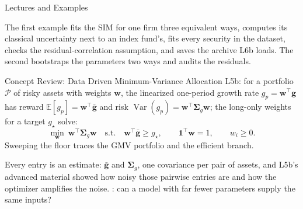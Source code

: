 \documentclass[aspectratio=169,11pt]{beamer}
\newcommand{\E}{\mathbb{E}}
\newcommand{\Var}{\operatorname{Var}}
\newcommand{\bg}{\mathbf{g}}
\newcommand{\bw}{\mathbf{w}}
\newcommand{\Sig}{\boldsymbol{\Sigma}_{g}}
\begin{document}
\begin{frame}{Lectures and Examples}
  \vspace{0.3em}
  {\normalsize\textbf{}\par
  }

  \vspace{0.7em}
  {\normalsize\textbf{}\par
  }

  \vspace{0.7em}
  {\normalsize\textbf{}\par
  }

  \vspace{0.6em}
  The first example fits the SIM for one firm three equivalent ways, computes
  its classical uncertainty next to an index fund's, fits every security in the
  dataset, checks the residual-correlation assumption, and saves the archive L6b
  loads. The second bootstraps the parameters two ways and audits the residuals.
\end{frame}

\begin{frame}{Concept Review: Data Driven Minimum-Variance Allocation}
  L5b: for a portfolio $\mathcal P$ of risky assets with weights $\bw$, the
  linearized one-period growth rate $g_p=\bw^{\top}\bg$ has reward
  $\E[g_p]=\bw^{\top}\bar{\bg}$ and risk $\Var(g_p)=\bw^{\top}\Sig\bw$; the
  long-only weights for a target $g_\star$ solve:
  \[
    \min_{\bw}\ \bw^{\top}\Sig\bw
    \quad\text{s.t.}\quad
    \bw^{\top}\bar{\bg}\ge g_\star,\qquad \mathbf 1^{\top}\bw=1,\qquad w_i\ge0.
  \]
  Sweeping the floor traces the GMV portfolio and the efficient branch.

  \vspace{0.4em}
  Every entry is an estimate: $\bar{\bg}$ and $\Sig$, one covariance per pair of
  assets, and L5b's advanced material showed how noisy those pairwise entries
  are and how the optimizer amplifies the noise. : can
  a model with far fewer parameters supply the same inputs?
\end{frame}
\end{document}
